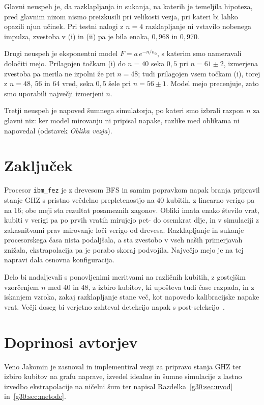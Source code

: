 Glavni neuspeh je, da razklapljanja in sukanja, na katerih je temeljila hipoteza, pred glavnim nizom nismo preizkusili pri velikosti vezja, pri kateri bi lahko opazili njun učinek. Pri testni nalogi z $n = 4$ razklapljanje ni vstavilo nobenega impulza, zvestoba v (i) in (ii) pa je bila enaka, $0{,}968$ in $0{,}970$.

Drugi neuspeh je eksponentni model $F = a\,e^{-n/n_0}$, s katerim smo nameravali določiti mejo. Prilagojen točkam (i) do $n = 40$ seka $0{,}5$ pri $n = 61 \pm 2$, izmerjena zvestoba pa merila ne izpolni že pri $n = 48$; tudi prilagojen vsem točkam (i), torej z $n = 48$, 56 in 64 vred, seka $0{,}5$ šele pri $n = 56 \pm 1$. Model mejo precenjuje, zato smo uporabili največji izmerjeni $n$.

Tretji neuspeh je napoved šumnega simulatorja, po kateri smo izbrali razpon $n$ za glavni niz: ker model mirovanju ni pripisal napake, razlike med oblikama ni napovedal (odstavek \emph{Oblika vezja}).


\section{Zaključek}
\label{g30:sec:zakljucek}

Procesor \texttt{ibm\_fez} je z drevesom BFS in samim popravkom napak branja pripravil stanje GHZ s pristno večdelno prepletenostjo na 40 kubitih, z linearno verigo pa na 16; obe meji sta rezultat posameznih zagonov. Obliki imata enako število vrat, kubiti v verigi pa po prvih vratih mirujejo pet- do osemkrat dlje, in v simulaciji z zakasnitvami prav mirovanje loči verigo od drevesa. Razklapljanje in sukanje procesorskega časa nista podaljšala, a sta zvestobo v vseh naših primerjavah znižala, ekstrapolacija pa je porabo skoraj podvojila. Največjo mejo je na tej napravi dala osnovna konfiguracija.

Delo bi nadaljevali s ponovljenimi meritvami na različnih kubitih, z gostejšim vzorčenjem $n$ med 40 in 48, z izbiro kubitov, ki upošteva tudi čase razpada, in z iskanjem vzroka, zakaj razklapljanje stane več, kot napovedo kalibracijske napake vrat. Večji doseg bi verjetno zahteval detekcijo napak s post-selekcijo~\cite{g30:bigcats2025}.


\section*{Doprinosi avtorjev}

Veno Jakomin je zasnoval in implementiral vezji za pripravo stanja GHZ ter izbiro kubitov na grafu naprave, izvedel idealne in šumne simulacije z lastno izvedbo ekstrapolacije na ničelni šum ter napisal Razdelka~\ref{g30:sec:uvod} in~\ref{g30:sec:metode}.

